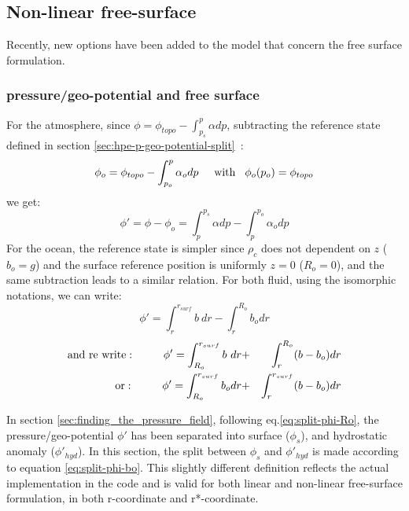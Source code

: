 


\subsection{Non-linear free-surface}
\label{sect:nonlinear-freesurface}

Recently, new options have been added to the model
that concern the free surface formulation.


\subsubsection{pressure/geo-potential and free surface}
\label{sect:phi-freesurface}

For the atmosphere, since $\phi = \phi_{topo} - \int^p_{p_s} \alpha dp$,
subtracting the reference state defined in section
\ref{sec:hpe-p-geo-potential-split}~:\\
$$
\phi_o = \phi_{topo} - \int^p_{p_o} \alpha_o dp  
\hspace{5mm}\mathrm{with}\hspace{3mm} \phi_o(p_o)=\phi_{topo}
$$
we get:
$$
\phi' = \phi - \phi_o = \int^{p_s}_p \alpha dp - \int^{p_o}_p \alpha_o dp
$$
For the ocean, the reference state is simpler since $\rho_c$ does not dependent
on $z$ ($b_o=g$) and the surface reference position is uniformly $z=0$ ($R_o=0$),
and the same subtraction leads to a similar relation.
For both fluid, using the isomorphic notations, we can write:
$$ 
\phi' = \int^{r_{surf}}_r b~ dr - \int^{R_o}_r b_o dr
$$
\begin{eqnarray}
\mathrm{and~re~write:}\hspace{10mm}
\phi' = \int^{r_{surf}}_{R_o} b~ dr & + & \int^{R_o}_r (b - b_o) dr
\label{eq:split-phi-Ro} \\ 
\mathrm{or:}\hspace{10mm}
\phi' = \int^{r_{surf}}_{R_o} b_o dr & + & \int^{r_{surf}}_r (b - b_o) dr
\label{eq:split-phi-bo}
\end{eqnarray}

In section \ref{sec:finding_the_pressure_field}, following eq.\ref{eq:split-phi-Ro},
the pressure/geo-potential $\phi'$ has been separated into surface ($\phi_s$),
and hydrostatic anomaly ($\phi'_{hyd}$).
In this section, the split between $\phi_s$ and $\phi'_{hyd}$ is 
made according to equation \ref{eq:split-phi-bo}. This slightly
different definition reflects the actual implementation in the code 
and is valid for both linear and non-linear
free-surface formulation, in both r-coordinate and r*-coordinate.

